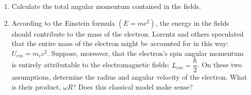 \documentclass[fleqn]{article}
\begin{document}
\begin{enumerate}
\begin{enumerate}
      \item Calculate the total angular momentum contained in the fields.


      \item According to the Einstein formula $(E = mc^2)$, the energy in the fields should
      contribute to the mass of the electron. Lorentz and others speculated that the
      entire mass of the electron might be accounted for in this way: $U_{em} = m_e c^2$.
      Suppose, moreover, that the electron’s spin angular momentum is entirely
      attributable to the electromagnetic fields: $L_{em}=\dfrac{\hbar}{2}$. On these two 
      assumptions, determine the radius and angular velocity of the electron. What is their
      product, $\omega R$? Does this classical model make sense?
      
    \end{enumerate}


  \end{enumerate}
\end{document}

